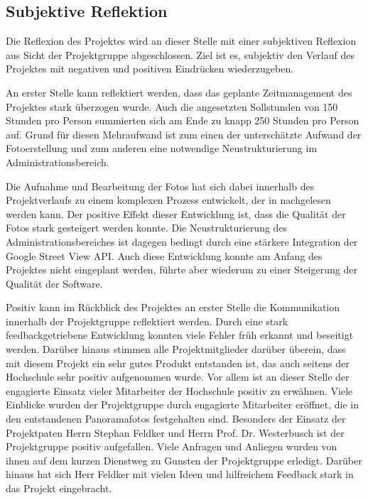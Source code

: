 \subsection{Subjektive Reflektion}
\label{sec:SubjektiveReflekion}

Die Reflexion des Projektes wird an dieser Stelle mit 
einer subjektiven Reflexion aus Sicht der Projektgruppe abgeschlossen. Ziel ist
es, subjektiv den Verlauf des Projektes mit negativen und positiven Eindrücken
wiederzugeben.

An erster Stelle kann reflektiert werden, dass das geplante Zeitmanagement
des Projektes stark überzogen wurde. Auch die angesetzten Sollstunden von
150 Stunden pro Person summierten sich am Ende zu knapp 250 Stunden pro Person auf.
Grund für diesen Mehraufwand ist zum einen der unterschätzte Aufwand der 
Fotoerstellung und zum anderen eine notwendige Neustrukturierung im 
Administrationsbereich.

Die Aufnahme und Bearbeitung der Fotos hat sich dabei innerhalb des
Projektverlaufs zu einem komplexen Prozess entwickelt, der in
\citet{modelierungUndBetrieb2014} nachgelesen werden kann. Der
positive Effekt dieser Entwicklung ist, dass die
Qualität der Fotos stark gesteigert werden konnte.
Die Neustrukturierung des Administrationsbereiches ist dagegen bedingt durch eine stärkere
Integration der Google Street View \acs{API}. Auch diese Entwicklung konnte am Anfang des Projektes
nicht eingeplant werden, führte aber wiederum zu einer Steigerung der Qualität der Software.

Positiv kann im Rückblick des Projektes an erster Stelle die Kommunikation
innerhalb der Projektgruppe reflektiert werden. Durch eine stark feedbackgetriebene
Entwicklung konnten viele Fehler früh erkannt und beseitigt werden.
Darüber hinaus stimmen alle Projektmitglieder darüber überein, dass mit diesem
Projekt ein sehr gutes Produkt entstanden ist, das auch seitens der Hochschule
sehr positiv aufgenommen wurde. Vor allem ist an dieser Stelle der engagierte Einsatz
vieler Mitarbeiter der Hochschule positiv zu erwähnen. Viele Einblicke wurden der
Projektgruppe durch engagierte Mitarbeiter eröffnet, die in den entstandenen Panoramafotos festgehalten sind.
Besonders der Einsatz der Projektpaten Herrn Stephan Feldker und Herrn Prof. Dr. Westerbusch 
ist der Projektgruppe positiv aufgefallen.
Viele Anfragen und Anliegen wurden von ihnen auf dem kurzen Dienstweg zu Gunsten der Projektgruppe
erledigt. Darüber hinaus hat sich Herr Feldker mit vielen Ideen und hilfreichem Feedback stark in das Projekt
eingebracht.